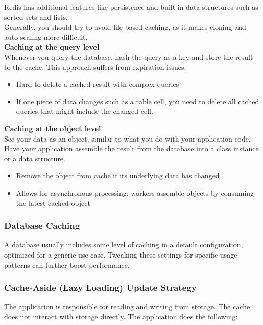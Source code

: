 \documentclass[12pt, titlepage]{article}
\begin{document}
Redis has additional features like persistence and built-in data structures such as sorted sets and lists. \\

Generally, you should try to avoid file-based caching, as it makes cloning and auto-scaling more difficult. \\

\textbf{Caching at the query level} \\
Whenever you query the database, hash the query as a key and store the result to the cache. This approach suffers from expiration issues:

\begin{itemize}
  \item Hard to delete a cached result with complex queries
  \item If one piece of data changes such as a table cell, you need to delete all cached queries that might include the changed cell.
\end{itemize}

\textbf{Caching at the object level} \\
See your data as an object, similar to what you do with your application code. Have your application assemble the result from the database into a class instance or a data structure.

\begin{itemize}
  \item Remove the object from cache if its underlying data has changed
  \item Allows for asynchronous processing: workers assemble objects by consuming the latest cached object
\end{itemize}

\subsubsection{Database Caching}

A database usually includes some level of caching in a default configuration, optimized for a generic use case. Tweaking these settings for specific usage patterns can further boost performance.

\subsubsection{Cache-Aside (Lazy Loading) Update Strategy}

The application is responsible for reading and writing from storage. The cache does not interact with storage directly. The application does the following:
\end{document}
